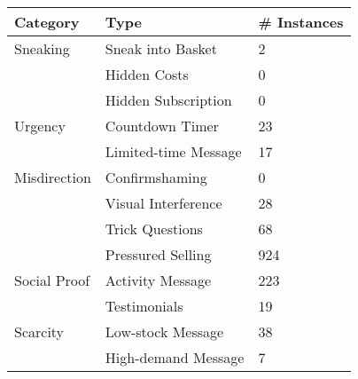 \begin{table}[h!]
    \centering
    \bgroup
    \def\arraystretch{1.65}
        \begin{tabular}{ll|l}
            \toprule
            \textbf{Category}                     & \textbf{Type}                      & \textbf{\# Instances}                     \\ \hline
            Sneaking                              & Sneak into Basket                  & 2                                         \\
                                                  & Hidden Costs                       & 0                                         \\
                                                  & Hidden Subscription                & 0                                         \\ \hline
            Urgency                               & Countdown Timer                    & 23                                        \\
                                                  & Limited-time Message               & 17                                        \\ \hline
            Misdirection                          & Confirmshaming                     & 0                                         \\
                                                  & Visual Interference                & 28                                        \\
                                                  & Trick Questions                    & 68                                        \\
                                                  & Pressured Selling                  & 924                                       \\ \hline
            Social Proof                          & Activity Message                   & 223                                       \\
                                                  & Testimonials                       & 19                                        \\ \hline
            Scarcity                              & Low-stock Message                  & 38                                        \\
                                                  & High-demand Message                & 7                                         \\ \hline

\end{tabular}
\end{table}
